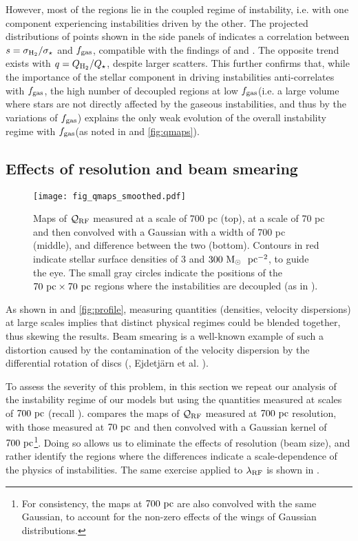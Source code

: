 \documentclass[useAMS,usenatbib]{mnras}
\newcommand{\fgas}{\ensuremath{f_{\rm gas}}\xspace}
\newcommand{\qrf}{\ensuremath{\mathcal{Q}_{\rm RF}}\xspace}
\newcommand{\lrf}{\ensuremath{\lambda_{\rm RF}}\xspace}
\begin{document}
However, most of the regions lie in the coupled regime of instability, i.e. with one component experiencing instabilities driven by the other. The projected distributions of points shown in the side panels of  indicates a correlation between $s=\sigma_{\rm H_2} / \sigma_{\star}$ and \fgas, compatible with the findings of \citet{Burkert2010} and \citet{Krumholz2010b}. The opposite trend exists with $q = Q_{\rm H_2} / Q_{\star}$, despite larger scatters. This further confirms that, while the importance of the stellar component in driving instabilities anti-correlates with \fgas, the high number of decoupled regions at low \fgas (i.e. a large volume where stars are not directly affected by the gaseous instabilities, and thus by the variations of \fgas) explains the only weak evolution of the overall instability regime with \fgas (as noted in  and \ref{fig:qmaps}). 


\subsection{Effects of resolution and beam smearing}
\label{sec:resolution}

\begin{figure*}
\centering
\texttt{[image: fig\_qmaps\_smoothed.pdf]}
\caption{Maps of \qrf measured at a scale of 700 pc (top), at a scale of 70 pc and then convolved with a Gaussian with a width of 700 pc (middle), and difference between the two (bottom). Contours in red indicate stellar surface densities of 3 and $300 \Msun\ \pc^{-2}$, to guide the eye. The small gray circles indicate the positions of the $70 \mathrm{~pc} \times 70 \mathrm{~pc}$ regions where the instabilities are decoupled (as in ).}
\label{fig:smooth}
\end{figure*}

As shown in  and \ref{fig:profile}, measuring quantities (densities, velocity dispersions) at large scales implies that distinct physical regimes could be blended together, thus skewing the results. Beam smearing is a well-known example of such a distortion caused by the contamination of the velocity dispersion by the differential rotation of discs (\citealt{Davies2011, Bacchini2019, Bacchini2020}, Ejdetj\"arn et al. \inprep).

To assess the severity of this problem, in this section we repeat our analysis of the instability regime of our models but using the quantities measured at scales of $700 \mathrm{~pc}$ (recall ).  compares the maps of \qrf measured at $700 \mathrm{~pc}$ resolution, with those measured at $70 \mathrm{~pc}$ and then convolved with a Gaussian kernel of $700 \mathrm{~pc}$\footnote{For consistency, the maps at $700 \mathrm{~pc}$ are also convolved with the same Gaussian, to account for the non-zero effects of the wings of Gaussian distributions.}. Doing so allows us to eliminate the effects of resolution (beam size), and rather identify the regions where the differences indicate a scale-dependence of the physics of instabilities. The same exercise applied to \lrf is shown in .
\end{document}

